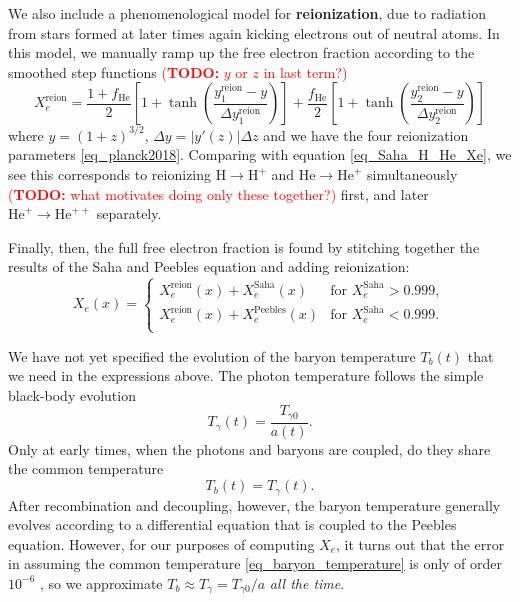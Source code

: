 \documentclass[10pt,a4paper]{article}
\newcommand\TODO[1]{\textcolor{red}{(\textbf{TODO:} #1)}}
\begin{document}
We also include a phenomenological model for \textbf{reionization}, due to radiation from stars formed at later times again kicking electrons out of neutral atoms.
In this model, we manually ramp up the free electron fraction according to the smoothed step functions
\TODO{$y$ or $z$ in last term?}
\begin{equation}
	X_e^\text{reion} = \frac{1+f_\text{He}}{2} \left[ 1 + \tanh \left( \frac{y^\text{reion}_1-y}{\Delta y^\text{reion}_1} \right) \right]
                     + \frac{f_\text{He}}{2} \left[ 1 + \tanh \left( \frac{y^\text{reion}_2-y}{\Delta y^\text{reion}_2} \right) \right]
\label{eq_reionization}
\end{equation}
where $y = (1+z)^{3/2}$, $\Delta y = |y'(z)| \Delta z$ and we have the four reionization parameters \eqref{eq_planck2018}.
Comparing with equation \eqref{eq_Saha_H_He_Xe}, we see this corresponds to reionizing $\text{H} \rightarrow \text{H}^+$ and $\text{He} \rightarrow \text{He}^+$ simultaneously \TODO{what motivates doing only these together?} first,
and later $\text{He}^{+} \rightarrow \text{He}^{++}$ separately.

Finally, then, the full free electron fraction is found by stitching together the results of the Saha and Peebles equation and adding reionization:
\begin{equation}
	X_e(x) = \begin{cases}
	             X_e^\text{reion}(x) + X_e^\text{Saha}(x) & \text{for $X_e^\text{Saha} > 0.999$}, \\
	             X_e^\text{reion}(x) + X_e^\text{Peebles}(x) & \text{for $X_e^\text{Saha} < 0.999$}. \\
	         \end{cases}
\label{eq_free_electron_fraction}
\end{equation}

We have not yet specified the evolution of the baryon temperature $T_b(t)$ that we need in the expressions above.
The photon temperature follows the simple black-body evolution
\begin{equation}
	T_\gamma(t) = \frac{T_{\gamma 0}}{a(t)}.
\label{eq_photon_temperature}
\end{equation}
Only at early times, when the photons and baryons are coupled, do they share the common temperature
\begin{equation}
	T_b(t) = T_{\gamma}(t).
\label{eq_baryon_temperature}
\end{equation}
After recombination and decoupling, however,
the baryon temperature generally evolves according to a differential equation that is coupled to the Peebles equation.
However, for our purposes of computing $X_e$,
it turns out that the error in assuming the common temperature \eqref{eq_baryon_temperature} is only of order $10^{-6}$ \cite[page 16]{keskitaloEffectMatterBaryon2005},
so we approximate $T_b \approx T_\gamma = T_{\gamma 0} / a$ \emph{all the time}.
\end{document}
